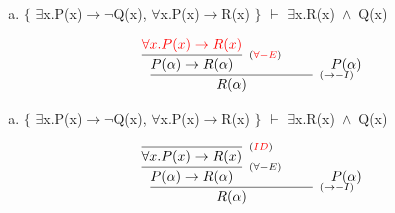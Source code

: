 \documentclass[aspectratio=43]{beamer}
\newcommand{\ria}{$\rightarrow$}
\newcommand{\fall}{$\forall$}
\newcommand{\ex}{$\exists$}
\newcommand{\nao}{$\neg$}
\newcommand{\andd}{$\wedge$}
\begin{document}
     \begin{frame}[fragile]
    
    	\begin{enumerate}[d)]
			\item $\{$ \ex x.P(x)\ria \nao Q(x), \fall x.P(x)\ria R(x) $\}$ $\vdash$ \ex x.R(x)\ \andd\ Q(x) \\
		\end{enumerate}
        
        \vspace{70pt}
        
        \[
        \begin{array}{c}
		
        	\infer[_{(\to -I)}]
            	{R(\alpha)}
            	{\infer[_{(\textcolor{red}{\forall -E})}]
                	{P(\alpha) \rightarrow R(\alpha)} 
                    {\textcolor{red}{\forall x.P(x)\to R(x)}} 
            	\hspace{35pt}
                P(\alpha)
                }
		\end{array}
        \]
        
	\end{frame}
    
    \begin{frame}[fragile]
    
    	\begin{enumerate}[d)]
			\item $\{$ \ex x.P(x)\ria \nao Q(x), \fall x.P(x)\ria R(x) $\}$ $\vdash$ \ex x.R(x)\ \andd\ Q(x) \\
		\end{enumerate}
        
        \vspace{70pt}
        
        \[
        \begin{array}{c}
		
        	\infer[_{(\to -I)}]
            	{R(\alpha)}
            	{\infer[_{(\forall -E)}]
                	{P(\alpha) \rightarrow R(\alpha)} 
                    {\infer[_{(\textcolor{red}{ID})}]
                    	{\forall x.P(x)\to R(x)}
                    	{}
                    } 
            	\hspace{35pt}
                P(\alpha)
                }
		\end{array}
        \]
        
	\end{frame}
    
\end{document}
